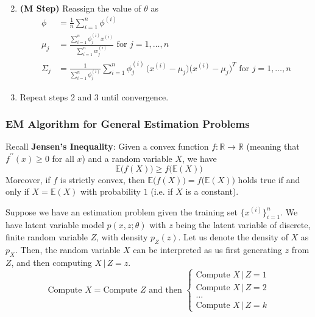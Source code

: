 \begin{definition}
\begin{enumerate}
\begin{align*}
            \end{align*}
          \item \textbf{(M Step)} Reassign the value of $\theta$ as 
            \begin{align*} 
              \phi & = \frac{1}{n} \sum_{i=1}^n \phi^{(i)} \\
              \mu_j & = \frac{\sum_{i=1}^n \phi_j^{(i)} x^{(i)}}{\sum_{i=1}^n w_j^{(i)}} \text{ for } j = 1, \ldots, n \\
              \Sigma_j & = \frac{1}{\sum_{i=1}^n \phi_j^{(i)}} \sum_{i=1}^n \phi^{(i)}_j \, \big(x^{(i)} - \mu_j \big) \big(x^{(i)} - \mu_j\big)^T \text{ for } j = 1, \ldots, n 
            \end{align*}
          \item Repeat steps 2 and 3 until convergence.
        \end{enumerate}
      \end{definition}

    \subsubsection{EM Algorithm for General Estimation Problems}

      Recall \textbf{Jensen's Inequality}: Given a convex function $f: \mathbb{R} \longrightarrow \mathbb{R}$ (meaning that $f^{\prime\prime} (x) \geq 0$ for all $x$) and a random variable $X$, we have 
      \[\mathbb{E}\big(f(X)\big) \geq f\big(\mathbb{E}(X)\big) \]
      Moreover, if $f$ is strictly convex, then $\mathbb{E}\big( f(X)\big) = f\big(\mathbb{E}(X)\big)$ holds true if and only if $X = \mathbb{E}(X)$ with probability $1$ (i.e. if $X$ is a constant). 

      Suppose we have an estimation problem given the training set $\{x^{(i)}\}_{i=1}^n$. We have latent variable model $p(x, z; \theta)$ with $z$ being the latent variable of discrete, finite random variable $Z$, with density $p_Z (z)$. Let us denote the density of $X$ as $p_X$. Then, the random variable $X$ can be interpreted as us first generating $z$ from $Z$, and then computing $X\,|\,Z = z$.  
      \[\text{Compute } X = \text{Compute } Z \text{ and then } \begin{cases} 
      \text{Compute } X \,|\, Z = 1 \\
      \text{Compute } X \,|\, Z = 2 \\
      \ldots \\
      \text{Compute } X \,|\, Z = k
      \end{cases}\]

